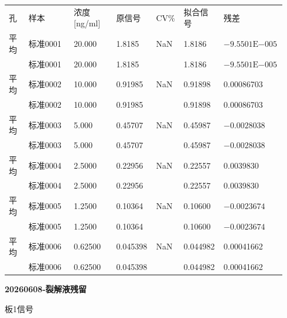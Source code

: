 \documentclass[UTF8,10pt,a4paper,fontset=fandol]{ctexart}
\begin{document}
\small
\begin{tabular}{@{}p{0.07\linewidth}p{0.16\linewidth}p{0.15\linewidth}p{0.14\linewidth}p{0.09\linewidth}p{0.14\linewidth}p{0.19\linewidth}@{}}
孔 & 样本 & 浓度 [ng/ml] & 原信号 & CV\% & 拟合信号 & 残差\\
平均 & 标准0001 & 20.000 & 1.8185 & NaN & 1.8186 & $-9.5501\mathrm{E}{-005}$\\
 & 标准0001 & 20.000 & 1.8185 &  & 1.8186 & $-9.5501\mathrm{E}{-005}$\\
平均 & 标准0002 & 10.000 & 0.91985 & NaN & 0.91898 & 0.00086703\\
 & 标准0002 & 10.000 & 0.91985 &  & 0.91898 & 0.00086703\\
平均 & 标准0003 & 5.000 & 0.45707 & NaN & 0.45987 & $-0.0028038$\\
 & 标准0003 & 5.000 & 0.45707 &  & 0.45987 & $-0.0028038$\\
平均 & 标准0004 & 2.5000 & 0.22956 & NaN & 0.22557 & 0.0039830\\
 & 标准0004 & 2.5000 & 0.22956 &  & 0.22557 & 0.0039830\\
平均 & 标准0005 & 1.2500 & 0.10364 & NaN & 0.10600 & $-0.0023674$\\
 & 标准0005 & 1.2500 & 0.10364 &  & 0.10600 & $-0.0023674$\\
平均 & 标准0006 & 0.62500 & 0.045398 & NaN & 0.044982 & 0.00041662\\
 & 标准0006 & 0.62500 & 0.045398 &  & 0.044982 & 0.00041662
\end{tabular}
\normalsize

\newpage

\begin{center}
\textbf{20260608-裂解液残留}\par
\smallskip
板1\quad 信号
\end{center}
\end{document}
